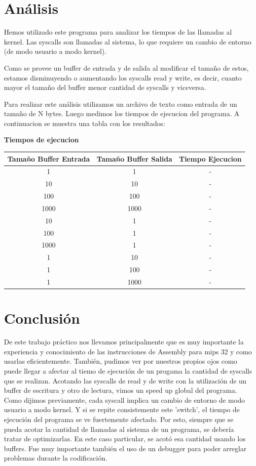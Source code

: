 \documentclass[11pt,a4paper]{article}
\begin{document}
\section{Análisis}
Hemos utilizado este programa para analizar los tiempos de las llamadas al kernel. Las syscalls son llamadas al sistema, lo que requiere un cambio de entorno (de modo usuario a modo kernel).

Como se provee un buffer de entrada y de salida al modificar el tamaño de estos, estamos disminuyendo o aumentando los syscalls read y write, es decir, cuanto mayor el tamaño del buffer menor cantidad de syscalls y viceversa.

Para realizar este análisis utilizamos un archivo de texto como entrada de un tamaño de N bytes. Luego medimos los tiempos de ejecucion del programa. A continuacion se muestra una tabla con los resultados:

\begin{table}[h]
	\centering
	\textbf{Tiempos de ejecucion}\\
	\begin{tabular}{|c|c|c|}
		\hline
		Tamaño Buffer Entrada & Tamaño Buffer Salida & Tiempo Ejecucion \\
		\hline
		1 & 1 & - \\
		\hline
		10 & 10 & - \\
		\hline
		100 & 100 & - \\
		\hline
		1000 & 1000 & - \\
		\hline
		10 & 1 & - \\
		\hline
		100 & 1 & - \\
		\hline
		1000 & 1 & - \\
		\hline
		1 & 10 & - \\
		\hline
		1 & 100 & - \\
		\hline
		1 & 1000 & - \\
		\hline
	\end{tabular}
\end{table}

\section{Conclusión}
De este trabajo práctico nos llevamos principalmente que es muy importante la experiencia y conocimiento de las instrucciones de Assembly para mips 32 y como usarlas eficientemente. También, pudimos ver por nuestros propios ojos como puede llegar a afectar al tiemo de ejecución de un progama la cantidad de syscalls que se realizan. Acotando las syscalls de read y de write con la utilización de un buffer de escritura y otro de lectura, vimos un speed up global del programa.
Como dijimos previamente, cada syscall implica un cambio de entorno de modo usuario a modo kernel. Y si se repite consistemente este 'switch', el tiempo de ejecución del programa se ve fuertemente afectado. Por esto, siempre que se pueda acotar la cantidad de llamadas al sistema de un programa, se debería tratar de optimizarlas. En este caso particular, se acotó esa cantidad usando los buffers. 
Fue muy importante también el uso de un debugger para poder arreglar problemas durante la codificación.
\end{document}
